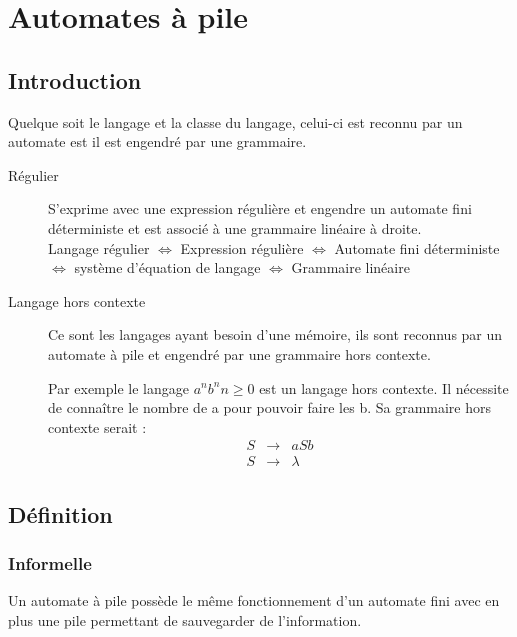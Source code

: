 \chapter{Automates à pile}
	\section{Introduction}
	Quelque soit le langage et la classe du langage, celui-ci est reconnu par un automate est il est engendré par une grammaire.

	\begin{description}
		\item[Régulier] S'exprime avec une expression régulière et engendre un automate fini déterministe et est associé à une grammaire linéaire à
			droite. \\
			Langage régulier $\Longleftrightarrow$ Expression régulière $\Longleftrightarrow$ Automate fini déterministe $\Longleftrightarrow$ système d'équation de
			langage $\Longleftrightarrow$ Grammaire linéaire
		\item[Langage hors contexte] Ce sont les langages ayant besoin d'une mémoire, ils sont reconnus par un automate à pile et engendré par une grammaire hors contexte.
			\begin{exemple}
				Par exemple le langage $a^nb^n n\geq 0$ est un langage hors contexte. Il nécessite de connaître le nombre de a pour pouvoir faire les b.
				Sa grammaire hors contexte serait : 
				\begin{eqnarray*}
					S &\rightarrow& a S b\\
					S &\rightarrow& \lambda
				\end{eqnarray*}
			\end{exemple}

	\end{description}
	\section{Définition}
		\subsection{Informelle}\label{defInformelle}
			Un automate à pile possède le même fonctionnement d'un automate fini avec en plus une pile permettant de sauvegarder de l'information. 

